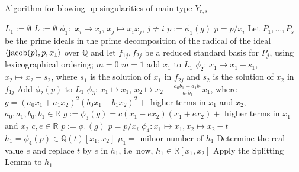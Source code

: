 \documentclass[noend]{amsproc}
\DeclareMathOperator{\m}{\mathfrak{m}}
\begin{document}
\begin{algorithm}[h]
\caption{Algorithm for blowing up singularities of main type $Y_{r,s}$\label{BlowingUp}}
\begin{algorithmic}[1]

\REQUIRE{ $g\in\m^3\subset\mathbb Q[x_1,x_2]$ of complex
singularity type $Y_{r,s}$.}
\STATE $L_1:=\emptyset$
\STATE $L:=\emptyset$
\STATE $\phi_1:$ $x_i\mapsto x_i$, $x_j\mapsto x_ix_j$,
$j\neq i$
\STATE $p:=\phi_1(g)$
\STATE $p=p/x_i$
\ENDWHILE
\STATE Let $P_1,\ldots,P_s$ be the prime ideals in the prime
decomposition
of the radical of the ideal
$\langle\textnormal{jacob}(p),p,x_1\rangle$ over $\mathbb Q$ and let
$f_{1j}, f_{2j}$ be a reduced standard basis for $P_j$, using
lexicographical
ordering;
\STATE $m=0$
\ELSE
\STATE $m=1$
\ENDIF
{}
\STATE add $x_1$ to $L_1$
\ENDIF
{}
\STATE $\phi_2$: $x_1\mapsto x_1-s_1$,
$x_2\mapsto x_2-s_2$, where $s_1$ is the solution of
$x_1$ in $f_{2j}$ and $s_2$ is the
solution of $x_2$ in $f_{1j}$
\STATE Add $\phi_2(p)$ to $L_1$
\ENDFOR
\ENDIF
\ENDFOR
\ELSE
\STATE $\phi_3$: $x_1\mapsto x_1$,
$x_2\mapsto x_2 -\frac{a_0b_1+a_1b_0}{a_1b_1}x_1$, where $g=(a_0x_1+a_1x_2)^2(b_0x_1+b_1x_2)^2+$ higher terms
in $x_1$ and $x_2$,
$a_0,a_1,b_0,b_1\in\mathbb R$
\STATE $g :=\phi_3(g)=c(x_1-ex_2)(x_1+ex_2)+$ higher terms
in $x_1$ and $x_2$ $c,e\in\mathbb R$
\STATE $p:=\phi_1(g)$
\STATE $p=p/x_i$
\ENDWHILE
\STATE $\phi_4: x_1\mapsto x_1, x_2\mapsto x_2-t$
\STATE $h_1=\phi_4(p)\in\mathbb Q(t)[x_1,x_2]$
\STATE $\mu_1 = $ milnor number of $h_1$
\STATE Determine the real value $e$ and replace $t$ by $e$
in $h_1$,
i.e~now, $h_1\in\mathbb R[x_1,x_2]$
\STATE Apply the Splitting Lemma to $h_1$

\end{algorithmic}
\end{algorithm}
\end{document}
